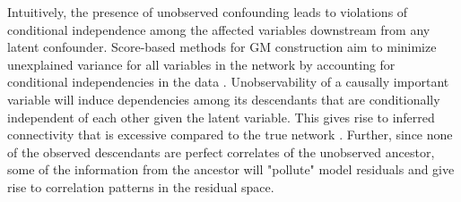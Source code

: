 \documentclass{article}
\begin{document}
Intuitively, the presence of unobserved confounding leads to violations of conditional independence among the affected variables downstream from any latent confounder.  Score-based methods for GM construction aim to minimize unexplained variance for all variables in the network by accounting for conditional independencies in the data \cite{pearl_causality:_2000,friedman_being_2013}.  Unobservability of a causally important variable will induce dependencies among its descendants that are conditionally independent of each other given the latent variable.  This gives rise to inferred connectivity that is excessive compared to the true network \cite{elidan_discovering_2001}.  Further, since none of the observed descendants are perfect correlates of the unobserved ancestor, some of the information from the ancestor will "pollute" model residuals and give rise to correlation patterns in the residual space.   
\end{document}
